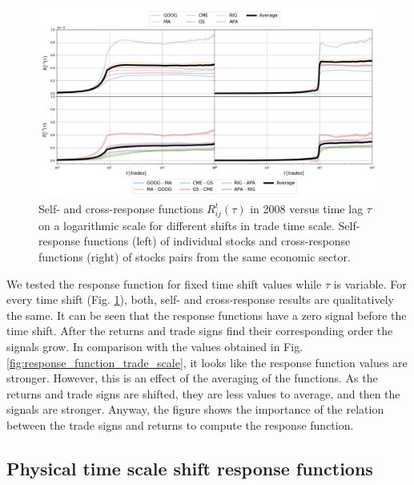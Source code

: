 \begin{figure}[htbp]
    \centering
    \includegraphics[width=\textwidth]{figures/04_shift_responses_trade.png}
    \caption{Self- and cross-response functions $R^{t}_{ij}\left(\tau\right)$
             in 2008 versus time lag $\tau$ on a logarithmic scale for
             different shifts in trade time scale. Self-response functions
             (left) of individual stocks and cross-response functions (right)
             of stocks pairs from the same economic sector.}
    \label{fig:shift_responses_trade_scale}
\end{figure}

We tested the response function for fixed time shift values while $\tau$ is
variable. For every time shift (Fig. \ref{fig:shift_responses_trade_scale}),
both, self- and cross-response results are qualitatively the same. It can be
seen that the response functions have a zero signal before the time shift.
After the returns and trade signs find their corresponding order the signals
grow. In comparison with the values obtained in Fig.
\ref{fig:response_function_trade_scale}, it looks like the response function
values are stronger. However, this is an effect of the averaging of the
functions. As the returns and trade signs are shifted, they are less values to
average, and then the signals are stronger. Anyway, the figure shows the
importance of the relation between the trade signs and returns to compute the
response function.

\subsection{Physical time scale shift response functions}
\label{subsec:time_shift_physical}

